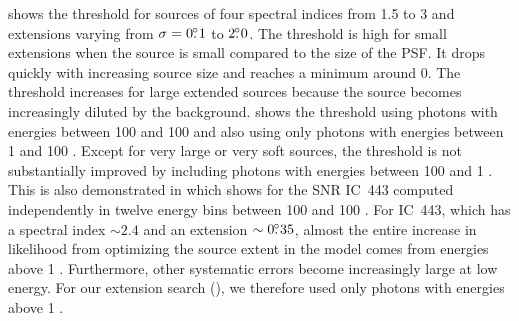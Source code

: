  shows the threshold for sources of four
spectral indices from 1.5 to 3 and extensions varying from $\sigma=0\mbox{$.\!\!^\circ$}1$
to $2\mbox{$.\!\!^\circ$}0$.  The threshold is high for small extensions when the
source is small compared to the size of the PSF.  It drops quickly
with increasing source size and reaches a minimum around 0.  The
threshold increases for large extended sources because the source becomes
increasingly diluted by the background.  
shows the threshold using photons with energies between 100 \mev and
100 \gev and also using only photons with energies between 1 \gev and
100 \gev.  Except for very large or very soft sources, the threshold is
not substantially improved by including photons with energies between 100
\mev and 1 \gev.  This is also demonstrated in 
which shows \tsext for the SNR IC~443 computed independently in twelve
energy bins between 100 \mev and 100 \gev. For IC~443, which has a
spectral index $\sim2.4$ and an extension $\sim0\mbox{$.\!\!^\circ$}35$, almost the
entire increase in likelihood from optimizing the source extent in the
model comes from energies above 1 \gev.  Furthermore, other systematic
errors become increasingly large at low energy. For our extension search
(), we therefore used only photons
with energies above 1 \gev.



